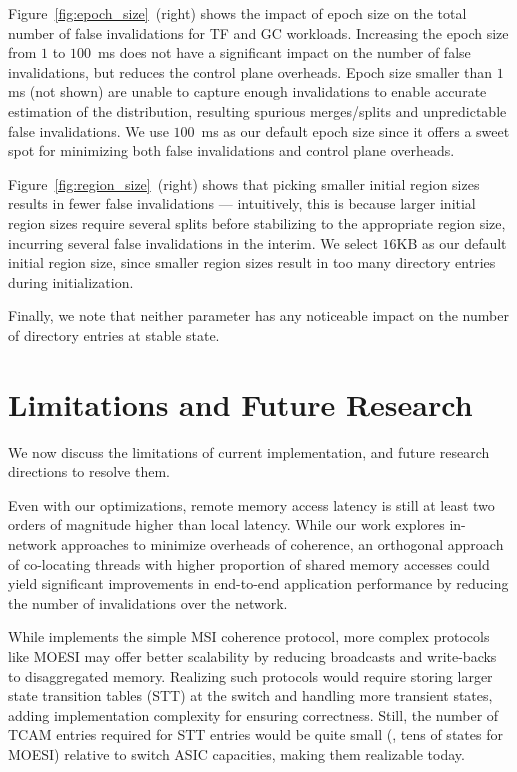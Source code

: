  Figure~\ref{fig:epoch_size}~(right) shows the impact of epoch size on the total number of false invalidations for TF and GC workloads. Increasing the epoch size from $1$ to $100$~ms does not have a significant impact on the number of false invalidations, but reduces the control plane overheads. Epoch size smaller than $1$ms (not shown) are unable to capture enough invalidations to enable accurate estimation of the distribution, resulting spurious merges/splits and unpredictable false invalidations. We use $100$~ms as our default epoch size since it offers a sweet spot for minimizing both false invalidations and control plane overheads.

Figure~\ref{fig:region_size}~(right) shows that picking smaller initial region sizes results in fewer false invalidations --- intuitively, this is because larger initial region sizes require several splits before stabilizing to the appropriate region size, incurring several false invalidations in the interim. We select $16$KB as our default initial region size, since smaller region sizes result in too many directory entries during initialization. 

Finally, we note that neither parameter has any noticeable impact on the number of directory entries at stable state.

\section{Limitations and Future Research}
\label{sec:discussion}

We now discuss the limitations of current \mind implementation, and future research directions to resolve them. 

 Even with our optimizations, remote memory access latency is still at least two orders of magnitude higher than local latency. While our work explores in-network approaches to minimize overheads of coherence, an orthogonal approach of co-locating threads with higher proportion of shared memory accesses could yield significant improvements in end-to-end application performance by reducing the number of invalidations over the network.

 While \mind implements the simple MSI coherence protocol, more complex protocols like MOESI may offer better scalability by reducing broadcasts and write-backs to disaggregated memory. Realizing such protocols would require storing larger state transition tables (STT) at the switch and handling more transient states, adding implementation complexity for ensuring correctness. Still, the number of TCAM entries required for STT entries would be quite small (\eg, tens of states for MOESI) relative to switch ASIC capacities, making them realizable today.

